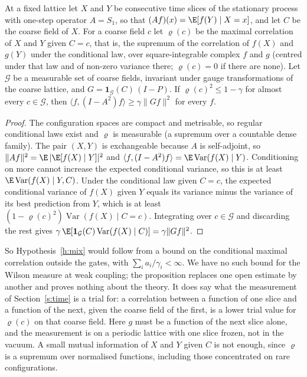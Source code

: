 \begin{proposition}\label{p:pred}
At a fixed lattice let $X$ and $Y$ be consecutive time slices of the stationary process with one-step operator
$A=S_1$, so that $(Af)(x)=\E[f(Y)\mid X=x]$, and let $C$ be the coarse field of $X$. For a coarse field $c$ let
$\varrho(c)$ be the maximal correlation of $X$ and $Y$ given $C=c$, that is, the supremum of the correlation
of $f(X)$ and $g(Y)$ under the conditional law, over square-integrable complex $f$ and $g$ (centred under
that law and of non-zero variance there; $\varrho(c)=0$ if there are none). Let $\mathcal G$ be a
measurable set of coarse fields, invariant under gauge transformations of the coarse lattice, and $G=\mathbf 1_{\mathcal G}(C)\,(I-P)$. If $\varrho(c)^2\le1-\gamma$ for
almost every $c\in\mathcal G$, then $\langle f,(I-A^2)f\rangle\ge\gamma\|Gf\|^2$ for every $f$.
\end{proposition}
\begin{proof}
The configuration spaces are compact and metrisable, so regular conditional laws exist and $\varrho$ is
measurable (a supremum over a countable dense family). The pair $(X,Y)$ is exchangeable because $A$ is self-adjoint, so $\|Af\|^2=\E\,|\E[f(X)\mid Y]|^2$ and
$\langle f,(I-A^2)f\rangle=\E\operatorname{Var}(f(X)\mid Y)$. Conditioning on more cannot increase the expected
conditional variance, so this is at least $\E\operatorname{Var}(f(X)\mid Y,C)$. Under the conditional law given
$C=c$, the expected conditional variance of $f(X)$ given $Y$ equals its variance minus the variance of its
best prediction from $Y$, which is at least $(1-\varrho(c)^2)\operatorname{Var}(f(X)\mid C=c)$. Integrating
over $c\in\mathcal G$ and discarding the rest gives
$\gamma\,\E[\mathbf 1_{\mathcal G}(C)\operatorname{Var}(f(X)\mid C)]=\gamma\|Gf\|^2$.
\end{proof}

So Hypothesis~\ref{h:mix} would follow from a bound on the conditional maximal correlation outside the gates,
with $\sum_ia_i/\gamma_i<\infty$. We have no such bound for the Wilson measure at weak coupling; the
proposition replaces one open estimate by another and proves nothing about the theory. It does say what the
measurement of Section~\ref{s:time} is a trial for: a correlation between a function of one slice and a
function of the next, given the coarse field of the first, is a lower trial value for $\varrho(c)$ on that
coarse field. Here $g$ must be a function of the next slice alone, and the measurement is on a periodic lattice
with one slice frozen, not in the vacuum. A small mutual information of $X$ and $Y$ given $C$ is not enough, since $\varrho$ is a supremum over
normalised functions, including those concentrated on rare configurations.

